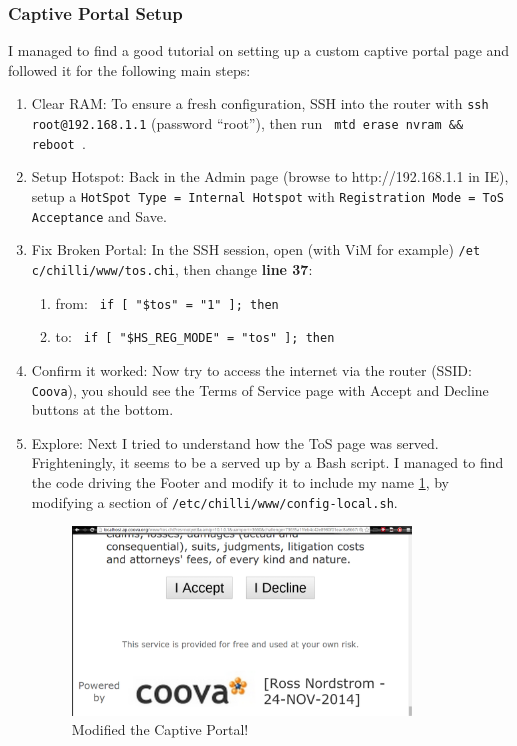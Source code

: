 \subsubsection{Captive Portal Setup}
I managed to find a good tutorial \cite{article:CoovaHotSpotSetup} on setting up a custom captive
portal page and followed it for the following main steps:
\begin{enumerate}
\item{Clear RAM:}  To ensure a fresh configuration, SSH into the router with \texttt{ssh
root@192.168.1.1} (password ``root''), then run \texttt{ mtd erase nvram \&\& reboot }.
\item{Setup Hotspot:}  Back in the Admin page (browse to http://192.168.1.1 in IE), setup a
\texttt{HotSpot Type = Internal Hotspot} with \texttt{Registration Mode = ToS Acceptance} and Save.
\item{Fix Broken Portal:}  In the SSH session, open (with ViM for example)
\texttt{/et c/chilli/www/tos.chi}, then change \textbf{line 37}:
  \begin{enumerate}
  \item{from:} \texttt{ if [ "\$tos" = "1" ]; then }
  \item{to:} \texttt{ if [ "\$HS\_REG\_MODE" = "tos" ]; then}
  \end{enumerate}
\item{Confirm it worked:}  Now try to access the internet via the router (SSID: \texttt{Coova}), you
should see the Terms of Service page with Accept and Decline buttons at the bottom.
\item{Explore:}  Next I tried to understand how the ToS page was served. Frighteningly, it seems to
be a served up by a Bash script. I managed to find the code driving the Footer and modify it to
include my name \ref{fig:footer}, by modifying a section of
\texttt{/etc/chilli/www/config-local.sh}.

\begin{figure}[ht!]
\centering
\includegraphics[width=90mm]{fig/footer.png}
\caption{Modified the Captive Portal!}
\label{fig:footer}
\end{figure}

\end{enumerate}